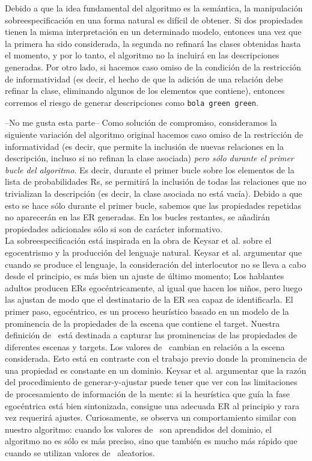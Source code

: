 Debido a que la idea fundamental del algoritmo es la sem\'antica, la manipulaci\'on sobreespecificaci\'on en
una forma natural es dif\'{i}cil de obtener. Si dos propiedades tienen la misma interpretaci\'on en un determinado
modelo, entonces una vez que la primera ha sido considerada, la segunda no refinar\'a las clases
obtenidas hasta el momento, y por lo tanto, el algoritmo no la incluir\'a en las descripciones generadas.
Por otro lado, si hacemos caso omiso de la condici\'on de la restricci\'on de informatividad (es decir,
el hecho de que la adici\'on de una relaci\'on debe refinar la clase, eliminando algunos de
los elementos que contiene), entonces corremos el riesgo de generar descripciones como \texttt{bola green green}.

--No me gusta esta parte--
Como soluci\'on de compromiso, consideramos la siguiente variaci\'on del algoritmo
original %
hacemos caso omiso de la restricci\'on de informatividad (es decir, que permite la inclusi\'on de nuevas relaciones
en la descripci\'on, incluso si no refinan la clase asociada) \emph{pero s\'olo durante el
primer bucle del algoritmo}. Es decir, durante el primer bucle sobre los elementos de la
lista de probabilidades Rs, se permitir\'a la inclusi\'on de todas las relaciones que no trivializan la
descripci\'on (es decir, la clase asociada no est\'a vac\'{i}a). Debido a que esto se hace s\'olo durante
el primer bucle, sabemos que las propiedades repetidas no aparecer\'an en las ER generadas.
En los bucles restantes, se a\~nadir\'an propiedades adicionales s\'olo si son de car\'acter informativo.\\


La sobreespecificaci\'on est\'a inspirada en la obra de Keysar et al. \cite{keysar:Curr98} sobre el egocentrismo y la producci\'on del lenguaje natural. 
Keysar et al. argumentar que cuando se produce el lenguaje, la consideraci\'on del interlocutor no se lleva a cabo desde el principio, 
es m\'as bien un ajuste de \'ultimo momento; Los hablantes adultos producen ERs egoc\'entricamente, al igual que hacen los ni\~nos, 
pero luego las ajustan de modo que el destinatario de la ER sea capaz de identificarla. El primer paso, egoc\'entrico, es un proceso
heur\'istico basado en un modelo de la prominencia de la propiedades de la escena que contiene el target. Nuestra definici\'on de
\puse\ est\'a destinada a capturar las prominencias de las propiedades de diferentes escenas y targets. Los valores de \puse\
cambian en relaci\'on a la escena considerada. Esto est\'a en contraste con el trabajo previo donde
la prominencia de una propiedad es constante en un dominio. Keysar et al. argumentar que la raz\'on del procedimiento de 
generar-y-ajustar puede tener que ver con las limitaciones de procesamiento de informaci\'on de la
mente: si la heur\'istica que gu\'ia la fase egoc\'entrica est\'a bien sintonizada, consigue una adecuada ER al principio
y rara vez requerir\'a ajustes. Curiosamente, se observa un comportamiento similar
con nuestro algoritmo: cuando los valores de \puse\ son
aprendidos del dominio, el algoritmo no es
s\'olo es m\'as preciso, sino que tambi\'en es mucho m\'as r\'apido que cuando se utilizan valores de \puse\ aleatorios.


